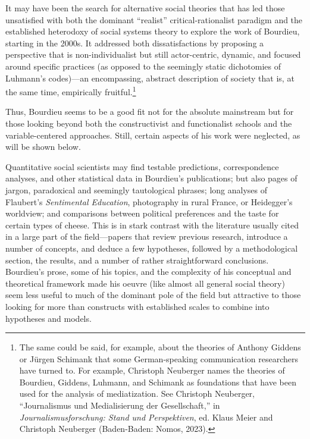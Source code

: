 \documentclass{tufte-handout}
\begin{document}
It may have been the search for alternative social theories that has led
those unsatisfied with both the dominant ``realist''
critical-rationalist paradigm and the established heterodoxy of social
systems theory to explore the work of Bourdieu, starting in the 2000s.
It addressed both dissatisfactions by proposing a perspective that is
non-individualist but still actor-centric, dynamic, and focused around
specific practices (as opposed to the seemingly static dichotomies of
Luhmann's codes)---an encompassing, abstract description of society that
is, at the same time, empirically fruitful.\footnote{The same could be
  said, for example, about the theories of Anthony Giddens or Jürgen
  Schimank that some German-speaking communication researchers have
  turned to. For example, Christoph Neuberger names the theories of
  Bourdieu, Giddens, Luhmann, and Schimank as foundations that have been
  used for the analysis of mediatization. See Christoph Neuberger,
  ``Journalismus und Medialisierung der Gesellschaft,'' in
  \emph{Journalismusforschung: Stand und Perspektiven}, ed. Klaus Meier
  and Christoph Neuberger (Baden-Baden: Nomos, 2023).}

Thus, Bourdieu seems to be a good fit not for the absolute mainstream
but for those looking beyond both the constructivist and functionalist
schools and the variable-centered approaches. Still, certain aspects of
his work were neglected, as will be shown below.

Quantitative social scientists may find testable predictions,
correspondence analyses, and other statistical data in Bourdieu's
publications; but also pages of jargon, paradoxical and seemingly
tautological phrases; long analyses of Flaubert's \emph{Sentimental
Education}, photography in rural France, or Heidegger's worldview; and
comparisons between political preferences and the taste for certain
types of cheese. This is in stark contrast with the literature usually
cited in a large part of the field---papers that review previous
research, introduce a number of concepts, and deduce a few hypotheses,
followed by a methodological section, the results, and a number of
rather straightforward conclusions. Bourdieu's prose, some of his
topics, and the complexity of his conceptual and theoretical framework
made his oeuvre (like almost all general social theory) seem less useful
to much of the dominant pole of the field but attractive to those
looking for more than constructs with established scales to combine into
hypotheses and models.
\end{document}
